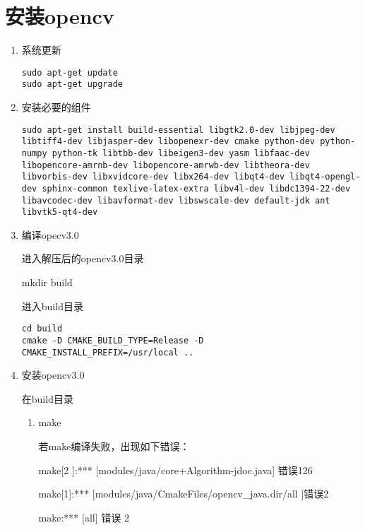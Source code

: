 \documentclass[12pt]{article}
\begin{document}
\section{安装opencv}

\begin{enumerate}

\item 系统更新

\begin{lstlisting}
sudo apt-get update
sudo apt-get upgrade
\end{lstlisting}

\item 安装必要的组件
\begin{lstlisting}
sudo apt-get install build-essential libgtk2.0-dev libjpeg-dev libtiff4-dev libjasper-dev libopenexr-dev cmake python-dev python-numpy python-tk libtbb-dev libeigen3-dev yasm libfaac-dev libopencore-amrnb-dev libopencore-amrwb-dev libtheora-dev libvorbis-dev libxvidcore-dev libx264-dev libqt4-dev libqt4-opengl-dev sphinx-common texlive-latex-extra libv4l-dev libdc1394-22-dev libavcodec-dev libavformat-dev libswscale-dev default-jdk ant libvtk5-qt4-dev
\end{lstlisting}
\item 编译opecv3.0

进入解压后的opencv3.0目录

mkdir build

进入build目录
\begin{lstlisting}
cd build
cmake -D CMAKE_BUILD_TYPE=Release -D CMAKE_INSTALL_PREFIX=/usr/local ..
\end{lstlisting}


\item 安装opencv3.0

在build目录

\begin{enumerate}

\item make  

若make编译失败，出现如下错误：

make[2 ]:*** [modules/java/core+Algorithm-jdoc.java] 错误126

make[1]:*** [modules/java/CmakeFiles/opencv\_java.dir/all ]错误2

make:*** [all] 错误 2


\end{enumerate}
\end{enumerate}
\end{document}
